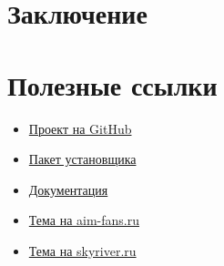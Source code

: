 \documentclass[a4paper,12pt]{report}
\begin{document}
\chapter*{Заключение}

\chapter*{Полезные ссылки}

\begin{itemize}
\item \href{https://github.com/aimrebirth}{Проект на GitHub}
\item \href{https://www.dropbox.com/s/0zhbgb1ftspcv9w/polygon4.zip?dl=1}{Пакет установщика}
\item \href{https://www.dropbox.com/s/ipnakg5civ0xp0g/Polygon4_ru.pdf?dl=1}{Документация}
\item \href{http://aim-fans.ru/index.php?showtopic=147}{Тема на aim-fans.ru}
\item \href{http://forum.skyriver.ru/viewtopic.php?f=26&t=4801}{Тема на skyriver.ru}
\end{itemize}
\end{document}
